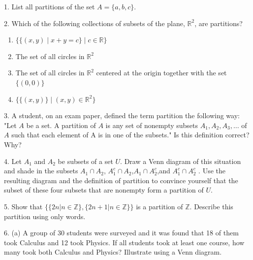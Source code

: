 \documentclass[10pt,]{book}
\theoremstyle{plain}
\theoremstyle{definition}
\begin{document}
\hypertarget{exercisegroup-14}{}\begin{exercisegroup}
\item[1.]\hypertarget{exercise-73}{} List all partitions of the set \(A =\{a, b, c\}\).
 \par\smallskip
\item[2.]\hypertarget{exercise-74}{}Which of the following collections of subsets of the plane, \( \mathbb{R}^2\), are partitions?
\leavevmode%
\begin{enumerate}[label=(\alph*)]
\item\hypertarget{li-229}{}\( \{ \{(x, y) \mid x + y = c \} \mid c \in \mathbb{R} \}\)\item\hypertarget{li-230}{} The set of all circles in \( \mathbb{R}^2 \)\item\hypertarget{li-231}{} The set of all circles in \(\mathbb{R}^2\) centered at the origin together with the set \(\{(0,0)\}\)\item\hypertarget{li-232}{}\(\{\{(x, y)\} \mid (x, y) \in \mathbb{R}^2  \} \)\end{enumerate}
\par\smallskip
\item[3.]\hypertarget{exercise-75}{}A student, on an exam paper, defined the term partition the following way: "Let \(A\)  be a set. A partition of \(A\) is any set of nonempty subsets \(A_1, A_2, A_3, \dots\)  of \(A\) such that each element of A is in one of the subsets."  Is this definition correct? Why?
\par\smallskip
\item[4.]\hypertarget{exercise-76}{} Let \(A_1\) and \(A_2\) be subsets of a set \(U\).   Draw a Venn diagram of this situation and shade in the subsets \(A_1 \cap A_2\), \(A_1^c \cap A_2\),\(A_1 \cap A_2^c\),and \(A_1^c \cap A_2^c\) . Use the resulting diagram and the definition of partition to convince yourself that the subset of these four subsets that are nonempty form a partition of \(U\).
\par\smallskip
\item[5.]\hypertarget{exercise-77}{} Show that \(\{\{2 n | n \in \mathbb{Z}\}, \{2 n + 1 | n \in \mathbb{Z}\}\}\) is a partition of \(\mathbb{Z}\). Describe this partition using only words.\par\smallskip
\item[6.]\hypertarget{exercise-78}{} (a) A group of 30 students were surveyed and it was found that 18 of them took Calculus and 12 took Physics. If all students took at least one course, how many took both Calculus and Physics? Illustrate using a Venn diagram.\\

\end{exercisegroup}
\end{document}
